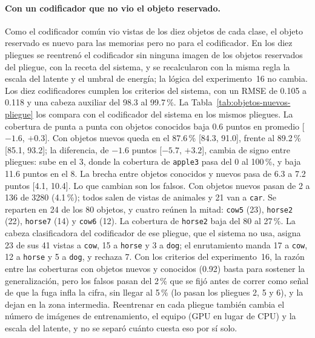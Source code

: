 \paragraph{Con un codificador que no vio el objeto reservado.}
Como el codificador común vio vistas de los diez objetos de cada clase, el objeto
reservado es nuevo para las memorias pero no para el codificador.
En los diez pliegues se reentrenó el codificador sin ninguna imagen de los
objetos reservados del pliegue, con la receta del sistema, y se recalcularon con la
misma regla la escala del latente y el umbral de energía; la lógica del experimento~16
no cambia.
Los diez codificadores cumplen los criterios del sistema, con un RMSE de 0.105 a 0.118 y
una cabeza auxiliar del 98.3 al 99.7\,\%.
La Tabla~\ref{tab:objetos-nuevos-pliegue} los compara con el codificador del sistema en
los mismos pliegues.
La cobertura de punta a punta con objetos conocidos baja 0.6 puntos en promedio
[$-1.6$, $+0.3$].
Con objetos nuevos queda en el 87.6\,\% [84.3, 91.0], frente al 89.2\,\% [85.1, 93.2];
la diferencia, de $-1.6$ puntos [$-5.7$, $+3.2$], cambia de signo entre pliegues: sube en
el 3, donde la cobertura de \texttt{apple3} pasa del 0 al 100\,\%, y baja 11.6 puntos
en el 8.
La brecha entre objetos conocidos y nuevos pasa de 6.3 a 7.2 puntos [4.1, 10.4].
Lo que cambian son los falsos.
Con objetos nuevos pasan de 2 a 136 de 3280 (4.1\,\%); todos salen de vistas de
animales y 21 van a \texttt{car}.
Se reparten en 24 de los 80 objetos, y cuatro reúnen la mitad: \texttt{cow5} (23),
\texttt{horse2} (22), \texttt{horse7} (14) y \texttt{cow6} (12).
La cobertura de \texttt{horse2} baja del 80 al 27\,\%.
La cabeza clasificadora del codificador de ese pliegue, que el sistema no usa, asigna 23
de sus 41 vistas a \texttt{cow}, 15 a \texttt{horse} y 3 a \texttt{dog}; el enrutamiento
manda 17 a \texttt{cow}, 12 a \texttt{horse} y 5 a \texttt{dog}, y rechaza 7.
Con los criterios del experimento~16, la razón entre las coberturas con objetos nuevos
y conocidos (0.92) basta para sostener la generalización, pero los falsos pasan del
2\,\% que se fijó antes de correr como señal de que la fuga infla la cifra, sin llegar al
5\,\% (lo pasan los pliegues 2, 5 y 6), y la dejan en la zona intermedia.
Reentrenar en cada pliegue también cambia el número de imágenes de entrenamiento, el
equipo (GPU en lugar de CPU) y la escala del latente, y no se separó cuánto cuesta eso
por sí solo.

